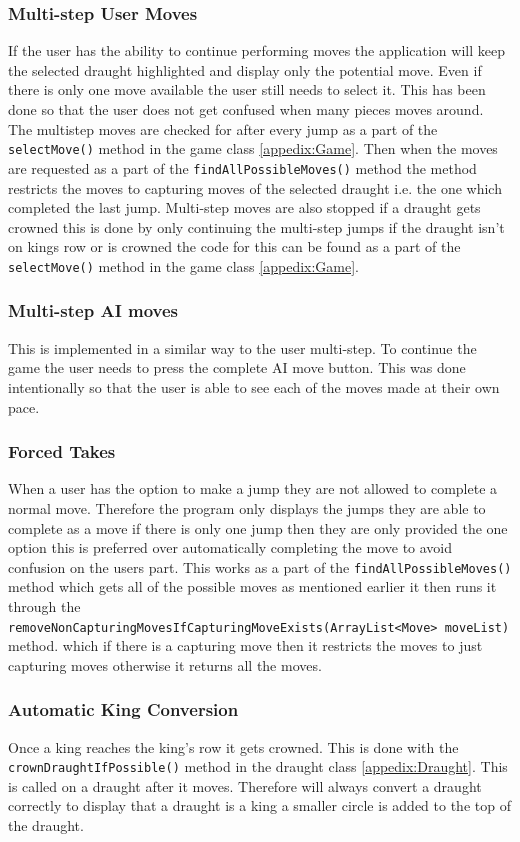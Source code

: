 \documentclass[a4paper,12pt]{scrartcl}
\begin{document}
{{			\subsubsection{Multi-step User Moves}{If the user has the ability to continue performing moves the application will keep the selected draught highlighted and display only the potential move. Even if there is only one move available the user still needs to select it. This has been done so that the user does not get confused when many pieces moves around. The multistep moves are checked for after every jump as a part of the \lstinline|selectMove()| method in the game class \cref{appedix:Game}. Then when the moves are requested as a part of the \lstinline|findAllPossibleMoves()| method the method restricts the moves to capturing moves of the selected draught i.e. the one which completed the last jump. Multi-step moves are also stopped if a draught gets crowned this is done by only continuing the multi-step jumps if the draught isn't on kings row or is crowned the code for this can be found as a part of the \lstinline|selectMove()| method in the game class \cref{appedix:Game}. }
			\subsubsection{Multi-step AI moves}{This is implemented in a similar way to the user multi-step. To continue the game the user needs to press the complete AI move button. This was done intentionally so that the user is able to see each of the moves made at their own pace.}
			\subsubsection{Forced Takes}{When a user has the option to make a jump they are not allowed to complete a normal move. Therefore the program only displays the jumps they are able to complete as a move if there is only one jump then they are only provided the one option this is preferred over automatically completing the move to avoid confusion on the users part. This works as a part of the \lstinline|findAllPossibleMoves()| method which gets all of the possible moves as mentioned earlier it then runs it through the \lstinline|removeNonCapturingMovesIfCapturingMoveExists(ArrayList<Move> moveList)| method. which if there is a capturing move then it restricts the moves to just capturing moves otherwise it returns all the moves.}
			\subsubsection{Automatic King Conversion}{
				Once a king reaches the king's row it gets crowned. This is done with the \lstinline|crownDraughtIfPossible()| method in the draught class \cref{appedix:Draught}. This is called on a draught after it moves. Therefore will always convert a draught correctly to display that a draught is a king a smaller circle is added to the top of the draught.
			}
		}
}
\end{document}
